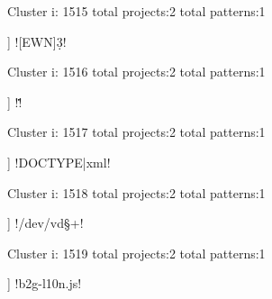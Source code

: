 Cluster i: 1515
total projects:2
total patterns:1
\begin{multicols}{1}
\begin{description}[noitemsep,topsep=0pt]
\item [[2] ] \cverb![EWN]\d{3}!
\end{description}
\end{multicols}







Cluster i: 1516
total projects:2
total patterns:1
\begin{multicols}{1}
\begin{description}[noitemsep,topsep=0pt]
\item [[2] ] \cverb!\. \. \.!
\end{description}
\end{multicols}







Cluster i: 1517
total projects:2
total patterns:1
\begin{multicols}{1}
\begin{description}[noitemsep,topsep=0pt]
\item [[2] ] \cverb!DOCTYPE|xml!
\end{description}
\end{multicols}







Cluster i: 1518
total projects:2
total patterns:1
\begin{multicols}{1}
\begin{description}[noitemsep,topsep=0pt]
\item [[2] ] \cverb!/dev/vd\S+!
\end{description}
\end{multicols}







Cluster i: 1519
total projects:2
total patterns:1
\begin{multicols}{1}
\begin{description}[noitemsep,topsep=0pt]
\item [[2] ] \cverb!b2g-l10n.js!
\end{description}
\end{multicols}







